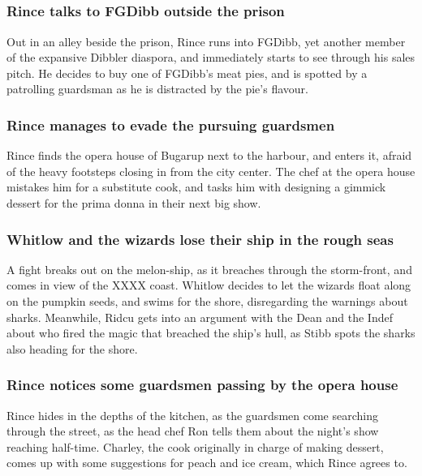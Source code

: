 \subsection{}
\subsubsection{\Gls{Rince} talks to \Gls{FGDibb} outside the prison}
Out in an alley beside the prison, \Gls{Rince} runs into \Gls{FGDibb}, yet another member of the
expansive Dibbler diaspora, and immediately starts to see through his sales pitch. He decides to
buy one of \Gls{FGDibb}'s meat pies, and is spotted by a patrolling guardsman as he is distracted
by the pie's flavour.

\subsubsection{\Gls{Rince} manages to evade the pursuing guardsmen}
\Gls{Rince} finds the opera house of Bugarup next to the harbour, and enters it, afraid of the
heavy footsteps closing in from the city center. The chef at the opera house mistakes him for a
substitute cook, and tasks him with designing a gimmick dessert for the prima donna in their next
big show.

\subsubsection{\Gls{Whitlow} and the wizards lose their ship in the rough seas}
A fight breaks out on the melon-ship, as it breaches through the storm-front, and comes in view of
the XXXX coast. \Gls{Whitlow} decides to let the wizards float along on the pumpkin seeds, and
swims for the shore, disregarding the warnings about sharks. Meanwhile, \Gls{Ridcu} gets into an
argument with the \Gls{Dean} and the \Gls{Indef} about who fired the magic that breached the ship's
hull, as \Gls{Stibb} spots the sharks also heading for the shore.

\subsubsection{\Gls{Rince} notices some guardsmen passing by the opera house}
\Gls{Rince} hides in the depths of the kitchen, as the guardsmen come searching through the street,
as the head chef \Gls{Ron} tells them about the night's show reaching half-time. \Gls{Charley}, the
cook originally in charge of making dessert, comes up with some suggestions for peach and ice cream,
which \Gls{Rince} agrees to.

